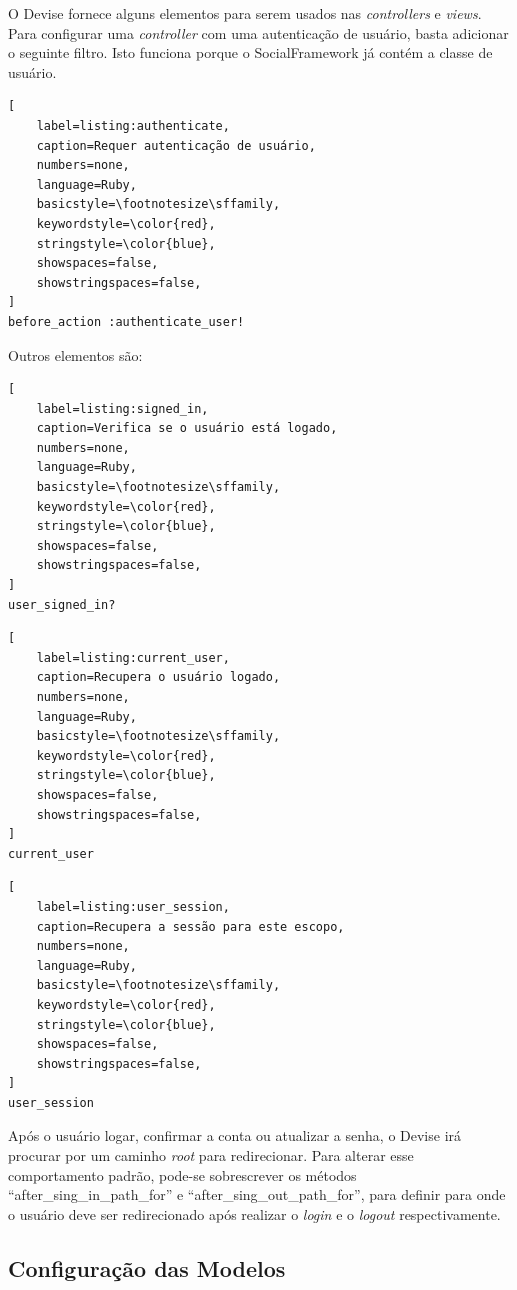 O Devise fornece alguns elementos para serem usados nas \textit{controllers} e \textit{views}. Para configurar uma \textit{controller} com uma autenticação de usuário, basta adicionar o seguinte filtro. Isto funciona porque o SocialFramework já contém a classe de usuário.

\begin{lstlisting}[
    label=listing:authenticate,
    caption=Requer autenticação de usuário,
    numbers=none,
    language=Ruby,
    basicstyle=\footnotesize\sffamily,
    keywordstyle=\color{red},
    stringstyle=\color{blue},
    showspaces=false,
    showstringspaces=false,
]
before_action :authenticate_user!
\end{lstlisting}

Outros elementos são:

\begin{lstlisting}[
    label=listing:signed_in,
    caption=Verifica se o usuário está logado,
    numbers=none,
    language=Ruby,
    basicstyle=\footnotesize\sffamily,
    keywordstyle=\color{red},
    stringstyle=\color{blue},
    showspaces=false,
    showstringspaces=false,
]
user_signed_in?
\end{lstlisting}

\begin{lstlisting}[
    label=listing:current_user,
    caption=Recupera o usuário logado,
    numbers=none,
    language=Ruby,
    basicstyle=\footnotesize\sffamily,
    keywordstyle=\color{red},
    stringstyle=\color{blue},
    showspaces=false,
    showstringspaces=false,
]
current_user
\end{lstlisting}

\begin{lstlisting}[
    label=listing:user_session,
    caption=Recupera a sessão para este escopo,
    numbers=none,
    language=Ruby,
    basicstyle=\footnotesize\sffamily,
    keywordstyle=\color{red},
    stringstyle=\color{blue},
    showspaces=false,
    showstringspaces=false,
]
user_session
\end{lstlisting}

Após o usuário logar, confirmar a conta ou atualizar a senha, o Devise irá procurar por um caminho \textit{root} para redirecionar. Para alterar esse comportamento padrão, pode-se sobrescrever os métodos ``after\_sing\_in\_path\_for'' e ``after\_sing\_out\_path\_for'', para definir para onde o usuário deve ser redirecionado após realizar o \textit{login} e o \textit{logout} respectivamente.

\subsection{Configuração das Modelos}
\label{configuracao_das_modelos}

